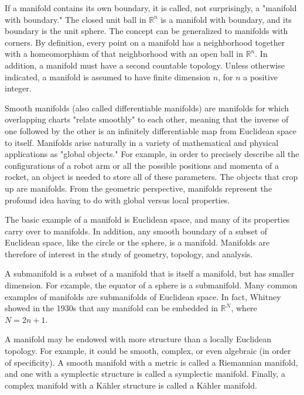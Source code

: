 \documentclass[lang=en,11pt,a4paper,cite=numbers]{elegantpaper}
\begin{document}
  If a manifold contains its own boundary, it is called, not surprisingly, a "manifold with boundary." The closed unit ball in $\mathbb{R}^n$ is a manifold with boundary, and its boundary is the unit sphere. The concept can be generalized to manifolds with corners. By definition, every point on a manifold has a neighborhood together with a homeomorphism of that neighborhood with an open ball in $\mathbb{R}^n$. In addition, a manifold must have a second countable topology. Unless otherwise indicated, a manifold is assumed to have finite dimension $n$, for $n$ a positive integer.

  Smooth manifolds (also called differentiable manifolds) are manifolds for which overlapping charts "relate smoothly" to each other, meaning that the inverse of one followed by the other is an infinitely differentiable map from Euclidean space to itself. Manifolds arise naturally in a variety of mathematical and physical applications as "global objects." For example, in order to precisely describe all the configurations of a robot arm or all the possible positions and momenta of a rocket, an object is needed to store all of these parameters. The objects that crop up are manifolds. From the geometric perspective, manifolds represent the profound idea having to do with global versus local properties.

  The basic example of a manifold is Euclidean space, and many of its properties carry over to manifolds. In addition, any smooth boundary of a subset of Euclidean space, like the circle or the sphere, is a manifold. Manifolds are therefore of interest in the study of geometry, topology, and analysis.

  A submanifold is a subset of a manifold that is itself a manifold, but has smaller dimension. For example, the equator of a sphere is a submanifold. Many common examples of manifolds are submanifolds of Euclidean space. In fact, Whitney showed in the 1930s that any manifold can be embedded in $\mathbb{R}^N$, where $N=2n+1$.

  A manifold may be endowed with more structure than a locally Euclidean topology. For example, it could be smooth, complex, or even algebraic (in order of specificity). A smooth manifold with a metric is called a Riemannian manifold, and one with a symplectic structure is called a symplectic manifold. Finally, a complex manifold with a Kähler structure is called a Kähler manifold.
\end{document}
